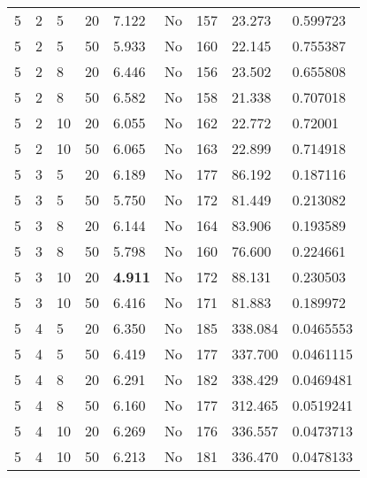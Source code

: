\begin{longtable}{x{1.5cm} x{1.8cm} x{1.8cm} x{1.5cm} x{1.8cm} x{1.5cm} x{1.5cm} x{1.5cm} x{1.8cm}}
	5 & 2 & 5 & 20 & 7.122 & No & 157 & 23.273 & 0.599723 \\
	5 & 2 & 5 & 50 & 5.933 & No & 160 & 22.145 & 0.755387 \\
	5 & 2 & 8 & 20 & 6.446 & No & 156 & 23.502 & 0.655808 \\
	5 & 2 & 8 & 50 & 6.582 & No & 158 & 21.338 & 0.707018 \\
	5 & 2 & 10 & 20 & 6.055 & No & 162 & 22.772 & 0.72001 \\
	5 & 2 & 10 & 50 & 6.065 & No & 163 & 22.899 & 0.714918 \\
	5 & 3 & 5 & 20 & 6.189 & No & 177 & 86.192 & 0.187116 \\
	5 & 3 & 5 & 50 & 5.750 & No & 172 & 81.449 & 0.213082 \\
	5 & 3 & 8 & 20 & 6.144 & No & 164 & 83.906 & 0.193589 \\
	5 & 3 & 8 & 50 & 5.798 & No & 160 & 76.600 & 0.224661 \\
	5 & 3 & 10 & 20 & \textbf{4.911} & No & 172 & 88.131 & 0.230503 \\
	5 & 3 & 10 & 50 & 6.416 & No & 171 & 81.883 & 0.189972 \\
	5 & 4 & 5 & 20 & 6.350 & No & 185 & 338.084 & 0.0465553 \\
	5 & 4 & 5 & 50 & 6.419 & No & 177 & 337.700 & 0.0461115 \\
	5 & 4 & 8 & 20 & 6.291 & No & 182 & 338.429 & 0.0469481 \\
	5 & 4 & 8 & 50 & 6.160 & No & 177 & 312.465 & 0.0519241 \\
	5 & 4 & 10 & 20 & 6.269 & No & 176 & 336.557 & 0.0473713 \\
	5 & 4 & 10 & 50 & 6.213 & No & 181 & 336.470 & 0.0478133\label{tab:calibration198} \\
\end{longtable}
\setlength{\arrayrulewidth}{1pt}
\renewcommand{\arraystretch}{1}